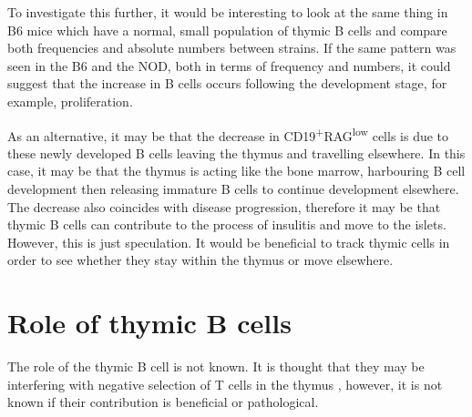 To investigate this further, it would be interesting to look at the same thing in B6 mice which have a normal, small population of thymic B cells and compare both frequencies and absolute numbers between strains.
If the same pattern was seen in the B6 and the NOD, both in terms of frequency and numbers, it could suggest that the increase in B cells occurs following the development stage, for example, proliferation.

As an alternative, it may be that the decrease in CD19\textsuperscript{+}RAG\textsuperscript{low} cells is due to these newly developed B cells leaving the thymus and travelling elsewhere.
In this case, it may be that the thymus is acting like the bone marrow, harbouring B cell development then releasing immature B cells to continue development elsewhere.
The decrease also coincides with disease progression, therefore it may be that thymic B cells can contribute to the process of insulitis and move to the islets.
However, this is just speculation.
It would be beneficial to track thymic cells in order to see whether they stay within the thymus or move elsewhere.









\section{Role of thymic B cells}

The role of the thymic B cell is not known.
It is thought that they may be interfering with negative selection of T cells in the thymus \citep{Frommer2010, Yamano2015}, however, it is not known if their contribution is beneficial or pathological.

